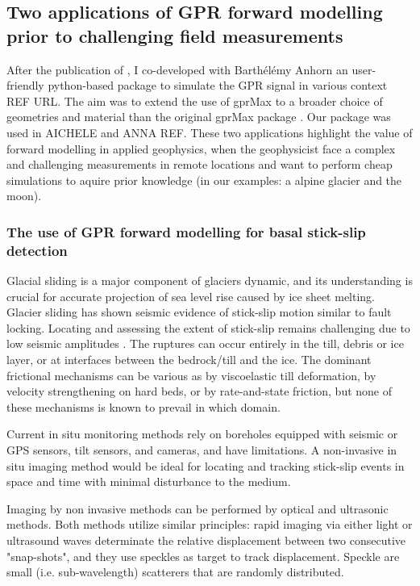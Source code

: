 \subsection{Two applications of GPR forward modelling prior to challenging field measurements}

After the publication of \citep{Ogier&al2023}, I co-developed with Barthélémy Anhorn an user-friendly python-based package to simulate the GPR signal in various context REF URL. The aim was to extend the use of gprMax to a broader choice of geometries and material than the original gprMax package \citep{Warren&al2016}. Our package was used in AICHELE and ANNA REF. These two applications highlight the value of forward modelling in applied geophysics, when the geophysicist face a complex and challenging measurements in remote locations and want to perform cheap simulations to aquire prior knowledge (in our examples: a alpine glacier and the moon). 

\subsubsection{The use of GPR forward modelling for basal stick-slip detection}

Glacial sliding is a major component of glaciers dynamic, and its understanding is crucial for accurate projection of sea level rise caused by ice sheet melting. Glacier sliding has shown seismic evidence of stick-slip motion similar to fault locking. Locating and assessing the extent of stick-slip remains challenging due to low seismic amplitudes \citep{Graff&al2021}. The ruptures can occur entirely in the till, debris or ice layer, or at interfaces between the bedrock/till and the ice.
The dominant frictional mechanisms can be various as by viscoelastic till deformation, by velocity strengthening on hard beds, or by rate-and-state friction, but none of these mechanisms is known to prevail in which domain.

Current in situ monitoring methods rely on boreholes equipped with seismic or GPS sensors, tilt sensors, and cameras, and have limitations. A non-invasive in situ imaging method would be ideal for locating and tracking stick-slip events in space and time with minimal disturbance to the medium.

Imaging by non invasive methods can be performed by optical and ultrasonic methods. Both methods utilize similar principles: rapid imaging via either light or ultrasound waves determinate the relative displacement between two consecutive "snap-shots", and they use speckles as target to track displacement. Speckle are small (i.e. sub-wavelength) scatterers that are randomly distributed. 

